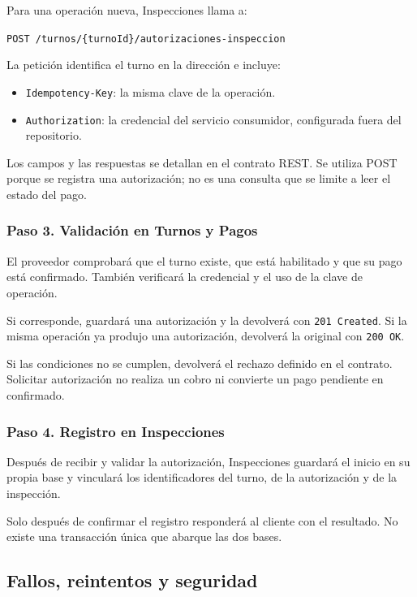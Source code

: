 \documentclass[11pt,a4paper]{article}
\begin{document}
Para una operación nueva, Inspecciones llama a:

\texttt{POST /\allowbreak{}turnos/\allowbreak{}\{turnoId\}/\allowbreak{}autorizaciones-inspeccion}

La petición identifica el turno en la dirección e incluye:

\begin{itemize}[nosep]
  \item \texttt{Idempotency-Key}: la misma clave de la operación.
  \item \texttt{Authorization}: la credencial del servicio consumidor, configurada fuera del repositorio.
\end{itemize}

Los campos y las respuestas se detallan en el contrato REST. Se utiliza POST porque se registra una autorización; no es una consulta que se limite a leer el estado del pago.

\subsubsection{Paso 3. Validación en Turnos y Pagos}

El proveedor comprobará que el turno existe, que está habilitado y que su pago está confirmado. También verificará la credencial y el uso de la clave de operación.

Si corresponde, guardará una autorización y la devolverá con \texttt{201 Created}. Si la misma operación ya produjo una autorización, devolverá la original con \texttt{200 OK}.

Si las condiciones no se cumplen, devolverá el rechazo definido en el contrato. Solicitar autorización no realiza un cobro ni convierte un pago pendiente en confirmado.

\subsubsection{Paso 4. Registro en Inspecciones}

Después de recibir y validar la autorización, Inspecciones guardará el inicio en su propia base y vinculará los identificadores del turno, de la autorización y de la inspección.

Solo después de confirmar el registro responderá al cliente con el resultado. No existe una transacción única que abarque las dos bases.

\subsection{Fallos, reintentos y seguridad}
\end{document}
